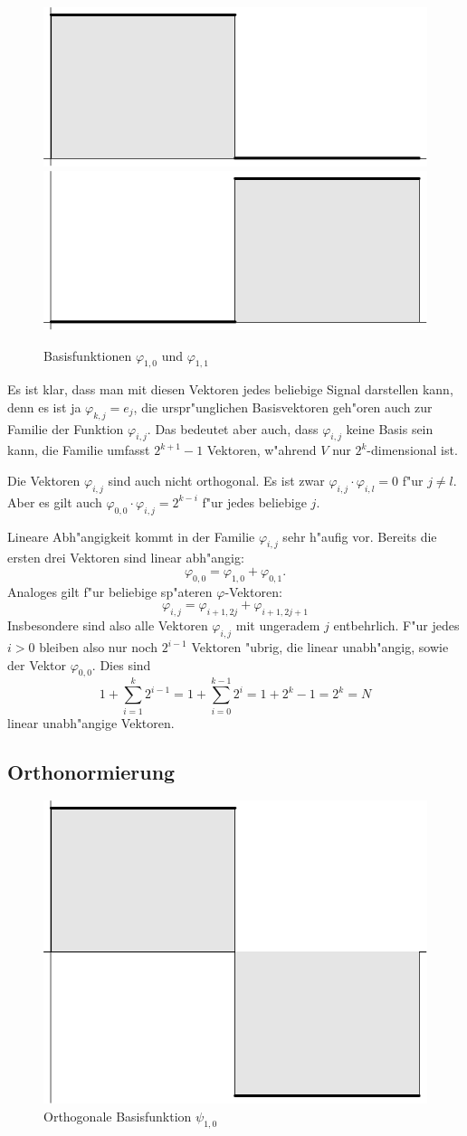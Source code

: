 \begin{figure}
\begin{center}
\includegraphics[width=0.45\hsize]{images/w-2}
\includegraphics[width=0.45\hsize]{images/w-3}
\end{center}
\caption{Basisfunktionen $\varphi_{1,0}$ und $\varphi_{1,1}$\label{wavelet-phi10-11}}
\end{figure}

Es ist klar, dass man mit diesen Vektoren jedes beliebige Signal
darstellen kann, denn es ist ja
$\varphi_{k,j}=e_j$, die urspr"unglichen Basisvektoren geh"oren 
auch zur Familie der Funktion $\varphi_{i,j}$. Das bedeutet
aber auch, dass $\varphi_{i,j}$ keine Basis sein kann, die Familie
umfasst $2^{k+1}-1$ Vektoren, w"ahrend $V$ nur $2^k$-dimensional ist.

Die Vektoren $\varphi_{i,j}$ sind auch nicht orthogonal. Es ist
zwar $\varphi_{i,j}\cdot\varphi_{i,l}=0$ f"ur $j\ne l$. Aber es
gilt auch $\varphi_{0,0}\cdot\varphi_{i,j}=2^{k-i}$ f"ur jedes
beliebige $j$.

Lineare Abh"angigkeit kommt in der Familie $\varphi_{i,j}$ sehr
h"aufig vor. Bereits die ersten drei Vektoren sind linear
abh"angig:
$$\varphi_{0,0}=\varphi_{1,0}+\varphi_{0,1}.$$
Analoges gilt f"ur beliebige sp"ateren $\varphi$-Vektoren:
$$
\varphi_{i,j}=\varphi_{i+1,2j}+\varphi_{i+1,2j+1}
$$
Insbesondere sind also alle Vektoren $\varphi_{i,j}$ mit 
ungeradem $j$ entbehrlich. F"ur jedes $i>0$ bleiben also
nur noch $2^{i-1}$ Vektoren "ubrig, die linear unabh"angig,
sowie der Vektor $\varphi_{0,0}$. Dies sind
$$
1+\sum_{i=1}^k 2^{i-1}=1+\sum_{i=0}^{k-1}2^i=1+2^{k}-1=2^{k}=N
$$
linear unabh"angige Vektoren.

\subsection{Orthonormierung}
\begin{figure}
\begin{center}
\includegraphics[width=0.45\hsize]{images/w-8}
\end{center}
\caption{Orthogonale Basisfunktion $\psi_{1,0}$\label{wavelet-psi10}}
\end{figure}

